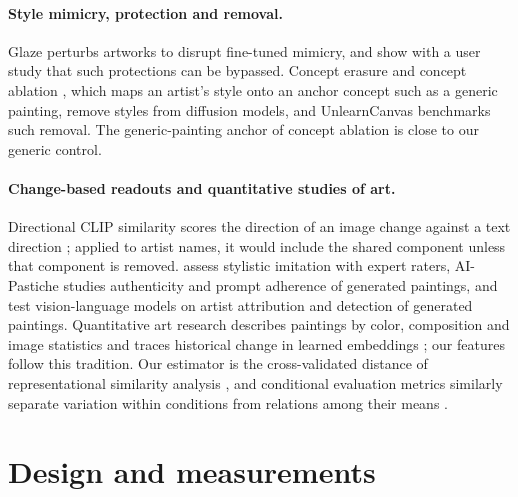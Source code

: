 \documentclass[10pt]{article}
\begin{document}
\paragraph{Style mimicry, protection and removal.}
Glaze \citep{shan2023glaze} perturbs artworks to disrupt fine-tuned mimicry, and
\citet{honig2025adversarial} show with a user study that such protections can be bypassed.
Concept erasure \citep{gandikota2023erasing} and concept ablation \citep{kumari2023ablating},
which maps an artist's style onto an anchor concept such as a generic painting, remove styles
from diffusion models, and UnlearnCanvas \citep{zhang2024unlearncanvas} benchmarks such removal.
The generic-painting anchor of concept ablation is close to our generic control.

\paragraph{Change-based readouts and quantitative studies of art.}
Directional CLIP similarity scores the direction of an image change against a text direction
\citep{gal2022stylegannada,brooks2023instructpix2pix}; applied to artist names, it would include
the shared component unless that component is removed. \citet{deliege2025} assess stylistic
imitation with expert raters, AI-Pastiche \citep{asperti2025pastiche} studies authenticity and
prompt adherence of generated paintings, and \citet{fu2025aiwikiart} test vision-language models
on artist attribution and detection of generated paintings. Quantitative art research describes
paintings by color, composition and image statistics \citep{kim2014,sigaki2018,lee2020} and
traces historical change in learned embeddings \citep{kim2026}; our features follow this
tradition. Our estimator is the cross-validated distance of representational similarity analysis
\citep{diedrichsen2017representational}, and conditional evaluation metrics similarly separate
variation within conditions from relations among their means \citep{naeem2020,benny2021conditional}.

\section{Design and measurements}\label{sec:design}
\end{document}
